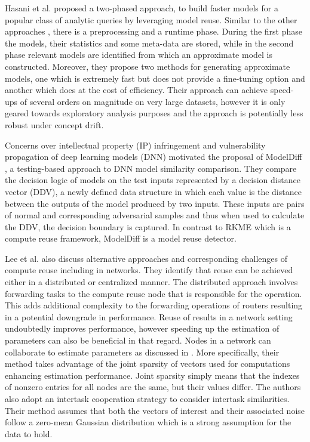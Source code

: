 \documentclass{mpaper}
\begin{document}
Hasani et al. \cite{MaterializationReuse} proposed a two-phased approach, to build faster models for a popular class of analytic queries by leveraging model reuse. Similar to the other approaches \cite{L2T, KernelMMD, ConceptDrift}, there is a preprocessing and a runtime phase. During the first phase the models, their statistics and some meta-data are stored, while in the second phase relevant models are identified from which an approximate model is constructed. Moreover, they propose two methods for generating approximate models, one which is extremely fast but does not provide a fine-tuning option and another which does at the cost of efficiency. Their approach can achieve speed-ups of several orders on magnitude on very large datasets, however it is only geared towards exploratory analysis purposes and the approach is potentially less robust under concept drift. 

Concerns over intellectual property (IP) infringement and vulnerability propagation of deep learning models (DNN) motivated the proposal of ModelDiff \cite{DNNSimilarity}, a testing-based approach to DNN model similarity comparison. They compare the decision logic of models on the test inputs represented by a decision distance vector (DDV), a newly defined data structure in which each value is the distance between the outputs of the model produced by two inputs. These inputs are pairs of normal and corresponding adversarial samples and thus when used to calculate the DDV, the decision boundary is captured. In contrast to RKME \cite{KernelMMD} which is a compute reuse framework, ModelDiff is a model reuse detector. 

Lee et al. \cite{ComputeReuse} also discuss alternative approaches and corresponding challenges of compute reuse including in networks. They identify that reuse can be achieved either in a distributed or centralized manner. The distributed approach involves forwarding tasks to the compute reuse node that is responsible for the operation. This adds additional complexity to the forwarding operations of routers resulting in a potential downgrade in performance. Reuse of results in a network setting undoubtedly improves performance, however speeding up the estimation of parameters can also be beneficial in that regard. Nodes in a network can collaborate to estimate parameters as discussed in \cite{DistributedEstimation}. More specifically, their method takes advantage of the joint sparsity of vectors used for computations enhancing estimation performance. Joint sparsity simply means that the indexes of nonzero entries for all nodes are the same, but their values differ.  The authors also adopt an intertask cooperation strategy to consider intertask similarities. Their method assumes that both the vectors of interest and their associated noise follow a zero-mean Gaussian distribution which is a strong assumption for the data to hold. 
\end{document}
